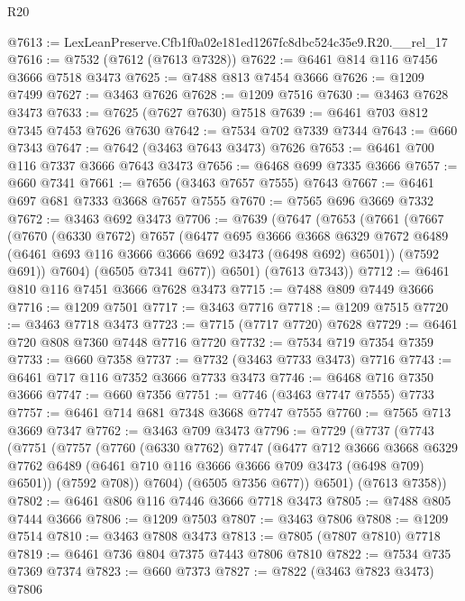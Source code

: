 \begin{lexlean}{R20}
\begin{coremodule}
@7613 := LexLeanPreserve.Cfb1f0a02e181ed1267fc8dbc524c35e9.R20.__rel_17
@7616 := @7532 (@7612 (@7613 @7328))
@7622 := @6461 @814 @116 @7456 @3666 @7518 @3473
@7625 := @7488 @813 @7454 @3666
@7626 := @1209 @7499
@7627 := @3463 @7626
@7628 := @1209 @7516
@7630 := @3463 @7628 @3473
@7633 := @7625 (@7627 @7630) @7518
@7639 := @6461 @703 @812 @7345 @7453 @7626 @7630
@7642 := @7534 @702 @7339 @7344
@7643 := @660 @7343
@7647 := @7642 (@3463 @7643 @3473) @7626
@7653 := @6461 @700 @116 @7337 @3666 @7643 @3473
@7656 := @6468 @699 @7335 @3666
@7657 := @660 @7341
@7661 := @7656 (@3463 @7657 @7555) @7643
@7667 := @6461 @697 @681 @7333 @3668 @7657 @7555
@7670 := @7565 @696 @3669 @7332
@7672 := @3463 @692 @3473
@7706 := @7639
    (@7647
      (@7653
        (@7661
          (@7667
            (@7670
              (@6330 @7672)
              @7657
              (@6477
                @695
                @3666
                @3668
                @6329
                @7672
                @6489
                (@6461 @693 @116 @3666 @3666 @692 @3473 (@6498 @692) @6501))
              (@7592 @691))
            @7604)
          (@6505 @7341 @677))
        @6501)
      (@7613 @7343))
@7712 := @6461 @810 @116 @7451 @3666 @7628 @3473
@7715 := @7488 @809 @7449 @3666
@7716 := @1209 @7501
@7717 := @3463 @7716
@7718 := @1209 @7515
@7720 := @3463 @7718 @3473
@7723 := @7715 (@7717 @7720) @7628
@7729 := @6461 @720 @808 @7360 @7448 @7716 @7720
@7732 := @7534 @719 @7354 @7359
@7733 := @660 @7358
@7737 := @7732 (@3463 @7733 @3473) @7716
@7743 := @6461 @717 @116 @7352 @3666 @7733 @3473
@7746 := @6468 @716 @7350 @3666
@7747 := @660 @7356
@7751 := @7746 (@3463 @7747 @7555) @7733
@7757 := @6461 @714 @681 @7348 @3668 @7747 @7555
@7760 := @7565 @713 @3669 @7347
@7762 := @3463 @709 @3473
@7796 := @7729
    (@7737
      (@7743
        (@7751
          (@7757
            (@7760
              (@6330 @7762)
              @7747
              (@6477
                @712
                @3666
                @3668
                @6329
                @7762
                @6489
                (@6461 @710 @116 @3666 @3666 @709 @3473 (@6498 @709) @6501))
              (@7592 @708))
            @7604)
          (@6505 @7356 @677))
        @6501)
      (@7613 @7358))
@7802 := @6461 @806 @116 @7446 @3666 @7718 @3473
@7805 := @7488 @805 @7444 @3666
@7806 := @1209 @7503
@7807 := @3463 @7806
@7808 := @1209 @7514
@7810 := @3463 @7808 @3473
@7813 := @7805 (@7807 @7810) @7718
@7819 := @6461 @736 @804 @7375 @7443 @7806 @7810
@7822 := @7534 @735 @7369 @7374
@7823 := @660 @7373
@7827 := @7822 (@3463 @7823 @3473) @7806

\end{coremodule}
\end{lexlean}
